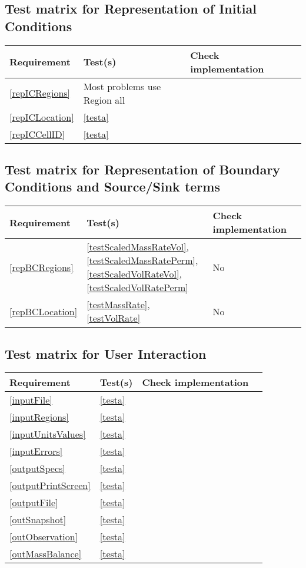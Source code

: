 \subsection{Test matrix for Representation of Initial Conditions}
\begin{tabular}{|l|l|l|l|}
	\hline
	Requirement & Test(s) & Check implementation \\
	\hline
	\hline
	\ref{repICRegions} & Most problems use Region all & \\
	\hline
	\ref{repICLocation} & \ref{testa} & \\
	\hline
	\ref{repICCellID} & \ref{testa} & \\
	\hline
\end{tabular}

\subsection{Test matrix for Representation of Boundary Conditions and Source/Sink terms}
\begin{tabular}{|l|l|l|l|}
	\hline
	Requirement & Test(s) & Check implementation \\
	\hline
	\hline
	\ref{repBCRegions}& \ref{testScaledMassRateVol}, \ref{testScaledMassRatePerm}, 
	\ref {testScaledVolRateVol}, \ref{testScaledVolRatePerm} & No \\
	\hline
	\ref{repBCLocation} & \ref{testMassRate}, \ref{testVolRate} & No \\
	\hline
\end{tabular}

\subsection{Test matrix for User Interaction}
\begin{tabular}{|l|l|l|l|}
	\hline
	Requirement & Test(s) & Check implementation \\
	\hline
	\hline
		\ref{inputFile} & \ref{testa} \\
	\hline
		\ref{inputRegions} & \ref{testa} \\
	\hline
		\ref{inputUnitsValues} & \ref{testa} \\
	\hline
		\ref{inputErrors} & \ref{testa} \\
	\hline
		\ref{outputSpecs} & \ref{testa} \\
	\hline
		\ref{outputPrintScreen} & \ref{testa} \\
	\hline
		\ref{outputFile} & \ref{testa} \\
	\hline
		\ref{outSnapshot} & \ref{testa} \\
	\hline
		\ref{outObservation} & \ref{testa} \\
	\hline
		\ref{outMassBalance} & \ref{testa} \\
	\hline
\end{tabular}

